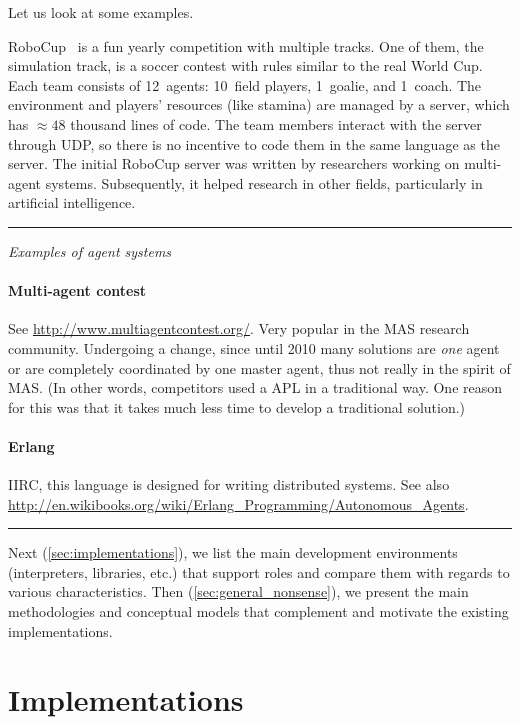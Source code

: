 \documentclass{article}
\newenvironment{notes}{\medskip\hrule\smallskip\narrower}{\smallskip\hrule\medskip}
\begin{document}
Let us look at some examples.

RoboCup~\cite{journals/robotics/KitanoANM1998,site/robocup} is a fun yearly competition with multiple tracks.
One of them, the simulation track, is a soccer contest with rules similar to the real World Cup.
Each team consists of 12~agents: 10~field players, 1~goalie, and 1~coach.
The environment and players' resources (like stamina) are managed by a server, which has $\approx48$ thousand lines of code.
The team members interact with the server through UDP, so there is no incentive to code them in the same language as the server.
The initial RoboCup server was written by researchers working on multi-agent systems.
Subsequently, it helped research in other fields, particularly in artificial intelligence.

\begin{notes}
\emph{Examples of agent systems}

\paragraph{Multi-agent contest}
See \url{http://www.multiagentcontest.org/}.
Very popular in the MAS research community.
Undergoing a change, since until 2010 many solutions are \emph{one} agent or are completely coordinated by one master agent, thus not really in the spirit of MAS.
(In other words, competitors used a APL in a traditional way.
One reason for this was that it takes much less time to develop a traditional solution.)


\paragraph{Erlang}
IIRC, this language is designed for writing distributed systems.
See also \url{http://en.wikibooks.org/wiki/Erlang_Programming/Autonomous_Agents}.

\end{notes}

Next (\autoref{sec:implementations}), we list the main development environments (interpreters, libraries, etc.) that support roles and compare them with regards to various characteristics.
Then (\autoref{sec:general_nonsense}), we present the main methodologies and conceptual models  that complement and motivate the existing implementations.

\section{Implementations}\label{sec:implementations} %
\end{document}
